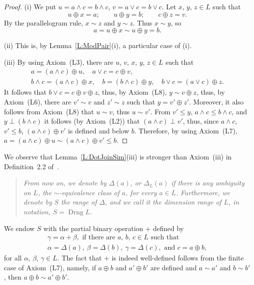 \documentclass[psamsfonts,reqno]{memo-l}
\theoremstyle{plain}
\theoremstyle{definition}
\theoremstyle{remark}
\numberwithin{equation}{section}
\newcommand{\DD}{\Delta}
\DeclareMathOperator{\Drng}{Drng}
\begin{document}
\begin{proof}
(i) We put $u=a\wedge c=b\wedge c$, $v=a\vee c=b\vee c$.
Let $x$, $y$, $z\in L$ such that
   \[
   u\oplus x=a;\qquad u\oplus y=b;\qquad c\oplus z=v.
   \]
By the parallelogram rule, $x\sim z$ and $y\sim z$. Thus $x\sim y$, so
   \[
   a=u\oplus x\sim u\oplus y=b.
   \]

(ii) This is, by Lemma~\ref{L:ModPair}(i), a particular case of (i).

(iii) By using Axiom~(L3), there are $u$, $v$, $x$, $y$, $z\in L$ such that
   \begin{gather*}
   a=(a\wedge c)\oplus u,\quad a\vee c=c\oplus v,\\
   b\wedge c=(a\wedge c)\oplus x,\quad
   b=(b\wedge c)\oplus y,\quad b\vee c=(a\vee c)\oplus z.
   \end{gather*}
It follows that $b\vee c=c\oplus v\oplus z$, thus, by Axiom~(L8),
$y\sim v\oplus z$, thus, by Axiom~(L6), there are $v'\sim v$ and $z'\sim z$
such that $y=v'\oplus z'$. Moreover, it also follows from Axiom~(L8) that
$u\sim v$, thus $u\sim v'$. {}From $v'\leq y$, $a\wedge c\leq b\wedge c$,
and $y\perp(b\wedge c)$ it follows (by Axiom~(L2)) that $(a\wedge c)\perp v'$,
thus, since $a\wedge c$, $v'\leq b$, $(a\wedge c)\oplus v'$ is defined and
below $b$. Therefore, by using Axiom~(L7),
$a=(a\wedge c)\oplus u\sim(a\wedge c)\oplus v'\leq b$.
\end{proof}

We observe that Lemma~\ref{L:DotJoinSim}(iii) is stronger than Axiom~(iii) in
Definition~2.2 of~\cite{Fill65}.

\begin{quote}
\em {}From now on, we denote by $\DD(a)$, or $\DD_L(a)$
\index{dzzelta@$\DD(a)$|ii} if there is any
ambiguity on $L$, the $\sim$-equivalence class of $a$, for every $a\in L$.
Furthermore, we denote by $S$ the range of $\DD$,
and we call it the
\emph{dimension range} of $L$, in notation,
$S=\Drng L$.\index{Dzzrng@$\Drng L$}
\end{quote}

We endow $S$ with the partial binary operation $+$ defined
by
   \begin{multline*}
   \gamma=\alpha+\beta,\text{ if there are }a,\,b,\,c\in L\text{ such that }\\
   \alpha=\DD(a),\ \beta=\DD(b),\ \gamma=\DD(c),\text{ and }c=a\oplus b,
   \end{multline*}
for all $\alpha$, $\beta$, $\gamma\in L$. The fact that $+$ is indeed
well-defined follows from the finite case of Axiom~(L7), namely, if
$a\oplus b$ and $a'\oplus b'$ are defined and $a\sim a'$ and $b\sim b'$, then
$a\oplus b\sim a'\oplus b'$.
\end{document}

